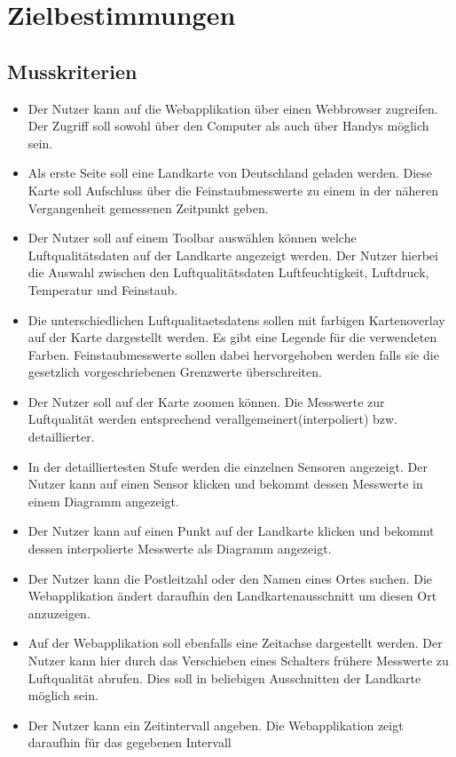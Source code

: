 \section{Zielbestimmungen}
\subsection{Musskriterien}
 \begin{itemize}
	\item Der Nutzer kann auf die Webapplikation über einen Webbrowser zugreifen. 
	Der Zugriff soll sowohl über den Computer als auch über Handys möglich sein.
	\item Als erste Seite soll eine Landkarte von Deutschland geladen werden.
	Diese Karte soll Aufschluss über die Feinstaubmesswerte zu einem in der näheren Vergangenheit gemessenen Zeitpunkt geben.
	\item Der Nutzer soll auf einem Toolbar auswählen können welche Luftqualitätsdaten auf der Landkarte angezeigt werden. 
	Der Nutzer hierbei die Auswahl zwischen den Luftqualitätsdaten Luftfeuchtigkeit, Luftdruck, Temperatur und Feinstaub.
	\item Die unterschiedlichen \glspl{Luftqualitaetsdaten} sollen mit farbigen Kartenoverlay auf der Karte dargestellt werden. 
	Es gibt eine Legende für die verwendeten Farben.
	Feinstaubmesswerte sollen dabei hervorgehoben werden falls sie die gesetzlich vorgeschriebenen Grenzwerte überschreiten.
	\item Der Nutzer soll auf der Karte zoomen können. 
	Die Messwerte zur Luftqualität werden entsprechend verallgemeinert(interpoliert) bzw. detaillierter.
	\item In der detailliertesten Stufe werden die einzelnen Sensoren angezeigt. 
	Der Nutzer kann auf einen Sensor klicken und bekommt dessen Messwerte in einem Diagramm angezeigt.
	\item Der Nutzer kann auf einen Punkt auf der Landkarte klicken und bekommt dessen interpolierte Messwerte als Diagramm angezeigt.
	\item Der Nutzer kann die Postleitzahl oder den Namen eines Ortes suchen. Die Webapplikation ändert daraufhin den Landkartenausschnitt um diesen Ort anzuzeigen.
	\item Auf der Webapplikation soll ebenfalls eine Zeitachse dargestellt werden. 
	Der Nutzer kann hier durch das Verschieben eines Schalters frühere Messwerte zu Luftqualität abrufen. 
	Dies soll in beliebigen Ausschnitten der Landkarte möglich sein.
	\item Der Nutzer kann ein Zeitintervall angeben. Die Webapplikation zeigt daraufhin für das gegebenen Intervall 

\end{itemize}
